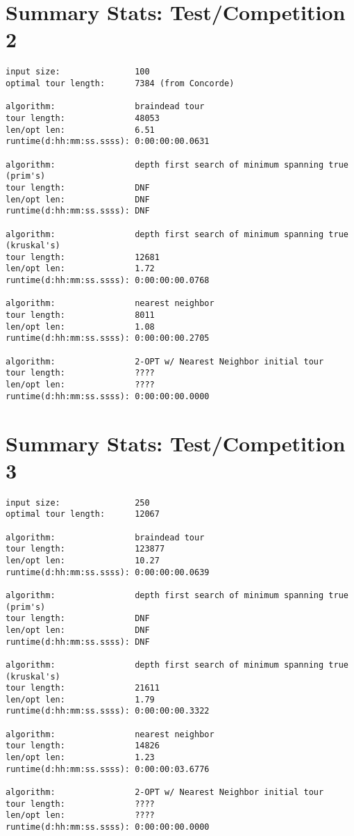 \documentclass[12pt]{article}
\begin{document}
\newpage
\section*{Summary Stats: Test/Competition 2}
\begin{verbatim}
input size:               100
optimal tour length:      7384 (from Concorde)

algorithm:                braindead tour
tour length:              48053
len/opt len:              6.51
runtime(d:hh:mm:ss.ssss): 0:00:00:00.0631

algorithm:                depth first search of minimum spanning true (prim's) 
tour length:              DNF
len/opt len:              DNF
runtime(d:hh:mm:ss.ssss): DNF

algorithm:                depth first search of minimum spanning true (kruskal's) 
tour length:              12681
len/opt len:              1.72
runtime(d:hh:mm:ss.ssss): 0:00:00:00.0768

algorithm:                nearest neighbor 
tour length:              8011
len/opt len:              1.08
runtime(d:hh:mm:ss.ssss): 0:00:00:00.2705

algorithm:                2-OPT w/ Nearest Neighbor initial tour
tour length:              ????
len/opt len:              ????
runtime(d:hh:mm:ss.ssss): 0:00:00:00.0000
\end{verbatim}

\newpage
\section*{Summary Stats: Test/Competition 3}
\begin{verbatim}
input size:               250
optimal tour length:      12067

algorithm:                braindead tour
tour length:              123877
len/opt len:              10.27
runtime(d:hh:mm:ss.ssss): 0:00:00:00.0639

algorithm:                depth first search of minimum spanning true (prim's) 
tour length:              DNF
len/opt len:              DNF
runtime(d:hh:mm:ss.ssss): DNF

algorithm:                depth first search of minimum spanning true (kruskal's) 
tour length:              21611
len/opt len:              1.79
runtime(d:hh:mm:ss.ssss): 0:00:00:00.3322

algorithm:                nearest neighbor 
tour length:              14826
len/opt len:              1.23
runtime(d:hh:mm:ss.ssss): 0:00:00:03.6776

algorithm:                2-OPT w/ Nearest Neighbor initial tour
tour length:              ????
len/opt len:              ????
runtime(d:hh:mm:ss.ssss): 0:00:00:00.0000
\end{verbatim}
\end{document}
